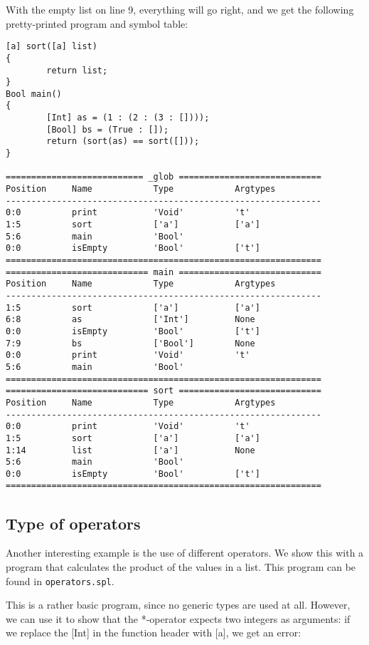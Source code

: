 \documentclass[a4paper]{article}
\begin{document}
With the empty list on line 9, everything will go right, and we get the following pretty-printed program and symbol table: 

\begin{verbatim}
[a] sort([a] list)
{
        return list;
}
Bool main()
{
        [Int] as = (1 : (2 : (3 : [])));
        [Bool] bs = (True : []);
        return (sort(as) == sort([]));
}

=========================== _glob ============================
Position     Name            Type            Argtypes            
--------------------------------------------------------------
0:0          print           'Void'          't'                 
1:5          sort            ['a']           ['a']               
5:6          main            'Bool'                              
0:0          isEmpty         'Bool'          ['t']               
==============================================================
============================ main ============================
Position     Name            Type            Argtypes            
--------------------------------------------------------------
1:5          sort            ['a']           ['a']               
6:8          as              ['Int']         None                
0:0          isEmpty         'Bool'          ['t']               
7:9          bs              ['Bool']        None                
0:0          print           'Void'          't'                 
5:6          main            'Bool'                              
==============================================================
============================ sort ============================
Position     Name            Type            Argtypes            
--------------------------------------------------------------
0:0          print           'Void'          't'                 
1:5          sort            ['a']           ['a']               
1:14         list            ['a']           None                
5:6          main            'Bool'                              
0:0          isEmpty         'Bool'          ['t']               
==============================================================
\end{verbatim}

\subsection{Type of operators}

Another interesting example is the use of different operators. We show this with a program that calculates the product of the values in a list. This program can be found in {\tt operators.spl}.

This is a rather basic program, since no generic types are used at all. However, we can use it to show that the *-operator expects two integers as arguments: if we replace the [Int] in the function header with [a], we get an error: 
\end{document}
